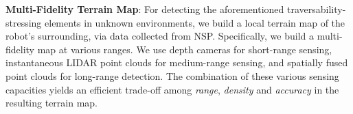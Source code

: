 \documentclass[letterpaper, 10pt, conference]{ieeeconf}      %
\newcommand{\ph}[1]{{\textbf{#1}:}} %
\begin{document}

\ph{Multi-Fidelity Terrain Map}
For detecting the aforementioned traversability-stressing elements in unknown environments, we build a local terrain map of the robot's surrounding, via data collected from NSP. %
Specifically, we build a multi-fidelity map at various ranges. We use depth cameras for short-range sensing, %
instantaneous LIDAR point clouds for medium-range sensing, %
and spatially fused point clouds \cite{oleynikova2017voxblox} for long-range detection. %
The combination of these various sensing capacities yields an efficient trade-off among \emph{range}, \emph{density} and \emph{accuracy} in the resulting terrain map.
\end{document}
